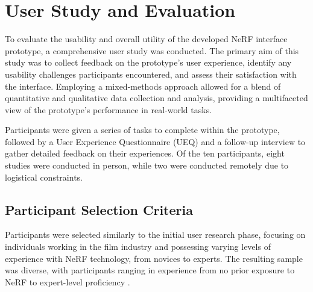 %
\chapter{User Study and Evaluation}
\label{sec:study}

To evaluate the usability and overall utility of the developed NeRF interface prototype, a comprehensive user study was conducted. 
The primary aim of this study was to collect feedback on the prototype's user experience, identify any usability challenges participants encountered, and assess their satisfaction with the interface. 
Employing a mixed-methods approach allowed for a blend of quantitative and qualitative data collection and analysis, providing a multifaceted view of the prototype's performance in real-world tasks.

Participants were given a series of tasks to complete within the prototype, followed by a User Experience Questionnaire (UEQ) and a follow-up interview to gather detailed feedback on their experiences.
Of the ten participants, eight studies were conducted in person, while two were conducted remotely due to logistical constraints.

\section{Participant Selection Criteria}
\label{sec:study:criteria}

Participants were selected similarly to the initial user research phase, focusing on individuals working in the film industry and possessing varying levels of experience with NeRF technology, from novices to experts.
The resulting sample was diverse, with participants ranging in experience from no prior exposure to NeRF to expert-level proficiency .

